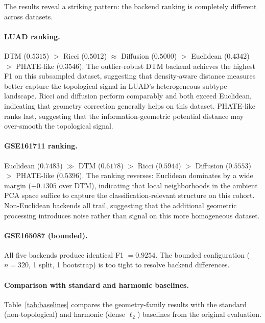 \documentclass[11pt]{article}
\begin{document}
The results reveal a striking pattern: the backend ranking is completely different across datasets.

\paragraph{LUAD ranking.}
DTM ($0.5315$) $>$ Ricci ($0.5012$) $\approx$ Diffusion ($0.5000$) $>$ Euclidean ($0.4342$) $>$ PHATE-like ($0.3546$).
The outlier-robust DTM backend achieves the highest F1 on this subsampled dataset, suggesting that density-aware distance measures better capture the topological signal in LUAD's heterogeneous subtype landscape.
Ricci and diffusion perform comparably and both exceed Euclidean, indicating that geometry correction generally helps on this dataset.
PHATE-like ranks last, suggesting that the information-geometric potential distance may over-smooth the topological signal.

\paragraph{GSE161711 ranking.}
Euclidean ($0.7483$) $\gg$ DTM ($0.6178$) $>$ Ricci ($0.5944$) $>$ Diffusion ($0.5553$) $>$ PHATE-like ($0.5396$).
The ranking reverses: Euclidean dominates by a wide margin ($+0.1305$ over DTM), indicating that local neighborhoods in the ambient PCA space suffice to capture the classification-relevant structure on this cohort.
Non-Euclidean backends all trail, suggesting that the additional geometric processing introduces noise rather than signal on this more homogeneous dataset.

\paragraph{GSE165087 (bounded).}
All five backends produce identical F1 $= 0.9254$.
The bounded configuration ($n = 320$, 1 split, 1 bootstrap) is too tight to resolve backend differences.

\paragraph{Comparison with standard and harmonic baselines.}
Table~\ref{tab:baselines} compares the geometry-family results with the standard (non-topological) and harmonic (dense $\ell_2$) baselines from the original evaluation.
\end{document}
